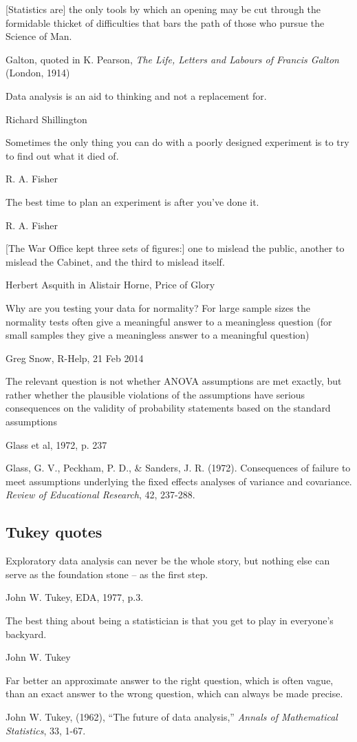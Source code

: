 \epigraph{[Statistics are] the only tools by which an opening may be cut through the formidable thicket of difficulties that bars the path of those who pursue the Science of Man.}{Galton, quoted in K. Pearson, \emph{The Life, Letters and Labours of Francis Galton} (London, 1914)}

\epigraph{Data analysis is an aid to thinking and not a replacement for.}{Richard Shillington}

\epigraph{Sometimes the only thing you can do with a poorly designed experiment is to try to find out what it died of.}{R. A. Fisher}

\epigraph{The best time to plan an experiment is after you've done it.}{R. A. Fisher}

\epigraph{[The War Office kept three sets of figures:] one to mislead the public, another to mislead the Cabinet, and the third to mislead itself.}{Herbert Asquith in Alistair Horne, Price of Glory}

\epigraph{Why are you testing your data for normality?  For large sample sizes the normality tests often give a meaningful answer to a meaningless question (for small samples they give a meaningless answer to a meaningful question)}{Greg Snow, R-Help, 21 Feb 2014}

\epigraph{The relevant question is not whether ANOVA assumptions are met exactly, but rather whether the plausible violations of the assumptions have serious consequences on the validity of probability statements based on the standard assumptions}{Glass et al, 1972, p. 237}
Glass, G. V., Peckham, P. D., \& Sanders, J. R. (1972). Consequences  of failure to meet 
assumptions underlying the fixed effects analyses of variance and covariance.
\emph{Review of Educational Research},  42, 237-288.  


\subsection{Tukey quotes}

\epigraph{Exploratory data analysis can never be the whole story, but nothing else	can serve as the foundation stone -- as the first step.}{John W. Tukey, EDA, 1977, p.3.} 


\epigraph{The best thing about being a statistician is that you get to play in everyone's backyard.}{John W. Tukey}

\epigraph{Far better an approximate answer to the right question, which is often vague, than an exact answer to the wrong question, which can always be made precise.}{John W. Tukey, (1962), ``The future of data analysis,'' \emph{Annals of Mathematical Statistics}, 33, 1-67.}

